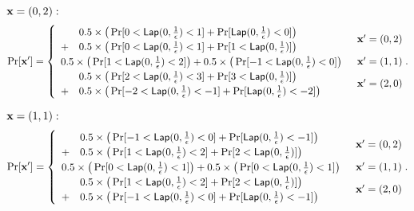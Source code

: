 \documentclass{article}
\begin{document}
{\small
\noindent $\textbf{x} = (0,2):$
\[
\Pr[\textbf{x}']
= \begin{cases}
\begin{array}{ll}
 	& 0.5 \times 
 	\big(
 	\Pr[	0	< \mathsf{Lap}(0, \frac{1}{\epsilon})	<	1] 
 	+ 
 	\Pr[	\mathsf{Lap}(0, \frac{1}{\epsilon})			<	0] 
 	\big) \\
 	+ 	
 	& 0.5 \times 
 	\big(
 	\Pr[	0	< \mathsf{Lap}(0, \frac{1}{\epsilon})	<	1] 
 	+ 
 	\Pr[	1 	< \mathsf{Lap}(0, \frac{1}{\epsilon})] 
 	\big) 
\end{array} 
	& \textbf{x}' = (0, 2)\\
\begin{array}{ll}
 	0.5 \times 
 	\big(
 	\Pr[	1	< \mathsf{Lap}(0, \frac{1}{\epsilon})	<	2] 
 	\big)
 	+ 	
 	0.5 \times 
 	\big(
 	\Pr[	-1	< \mathsf{Lap}(0, \frac{1}{\epsilon})	<	0] 
 	\big) 
\end{array}  
	& \textbf{x}' = (1, 1)\\
\begin{array}{ll}
 	& 0.5 \times 
 	\big(
 	\Pr[	2	<	\mathsf{Lap}(0, \frac{1}{\epsilon})	<	3] 
 	+ 
 	\Pr[	3	<	\mathsf{Lap}(0, \frac{1}{\epsilon})]
 	\big) \\
 	+ 	
 	& 0.5 \times 
 	\big(
 	\Pr[	-2	< \mathsf{Lap}(0, \frac{1}{\epsilon})	<	-1] 
 	+ 
 	\Pr[	\mathsf{Lap}(0, \frac{1}{\epsilon})			<	-2] 
 	\big) 
\end{array}  
& \textbf{x}' = (2, 0)
\end{cases}.
\]


\noindent $\textbf{x} = (1,1):$
\[
\Pr[\textbf{x}']
= \begin{cases}
\begin{array}{ll}
 	& 0.5 \times 
 	\big(
 	\Pr[	-1	< \mathsf{Lap}(0, \frac{1}{\epsilon})	<	0] 
 	+ 
 	\Pr[	\mathsf{Lap}(0, \frac{1}{\epsilon})			<	-1] 
 	\big) \\
 	+ 	
 	& 0.5 \times 
 	\big(
 	\Pr[	1	< \mathsf{Lap}(0, \frac{1}{\epsilon})	<	2] 
 	+ 
 	\Pr[	2 	< \mathsf{Lap}(0, \frac{1}{\epsilon})] 
 	\big) 
\end{array} 
	& \textbf{x}' = (0, 2)\\
\begin{array}{ll}
 	0.5 \times 
 	\big(
 	\Pr[	0	< \mathsf{Lap}(0, \frac{1}{\epsilon})	<	1] 
 	\big)
 	+ 	
 	0.5 \times 
 	\big(
 	\Pr[	0	< \mathsf{Lap}(0, \frac{1}{\epsilon})	<	1] 
 	\big) 
\end{array}  
	& \textbf{x}' = (1, 1)\\
\begin{array}{ll}
 	& 0.5 \times 
 	\big(
 	\Pr[	1	<	\mathsf{Lap}(0, \frac{1}{\epsilon})	<	2] 
 	+ 
 	\Pr[	2	<	\mathsf{Lap}(0, \frac{1}{\epsilon})]
 	\big) \\
 	+ 	
 	& 0.5 \times 
 	\big(
 	\Pr[	-1	< \mathsf{Lap}(0, \frac{1}{\epsilon})	<	0] 
 	+ 
 	\Pr[	\mathsf{Lap}(0, \frac{1}{\epsilon})			<	-1] 
 	\big) 
\end{array}  
& \textbf{x}' = (2, 0)
\end{cases}.
\]

}
\end{document}
